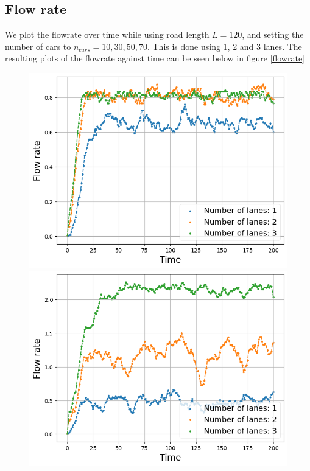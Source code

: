 \documentclass[a4paper,12pt]{article}
\begin{document}
\subsection*{Flow rate}
We plot the flowrate over time while using road length $L=120$, and setting the number of cars to $n_{cars}=10, 30, 50, 70$. This is done using 1, 2 and 3 lanes.
The resulting plots of the flowrate against time can be seen below in figure \ref*{flowrate}
\begin{figure}[H]
    \centering
    \begin{minipage}{.5\textwidth}
        \centering
        \includegraphics[scale=0.47]{Images/flowrate time 10 cars.png}
    \end{minipage}%
    \begin{minipage}{.5\textwidth}
        \centering
        \includegraphics[scale=0.47]{Images/flowrate time 30 cars.png}

\end{minipage}
\end{figure}
\end{document}
